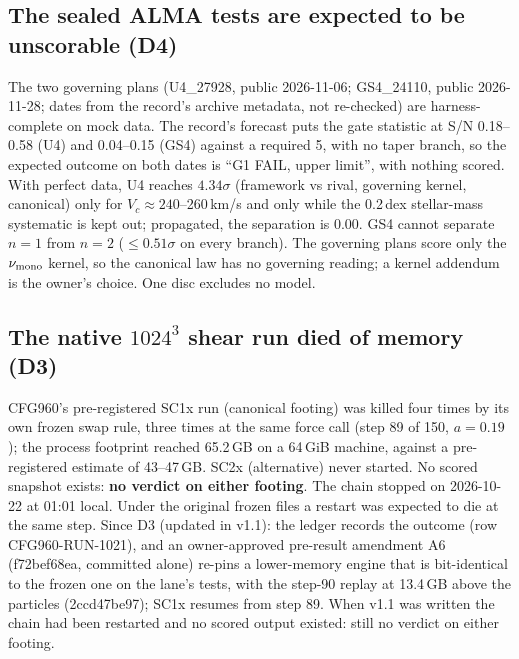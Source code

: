 \documentclass[10pt]{article}
\begin{document}
\subsection{The sealed ALMA tests are expected to be unscorable (D4)}
The two governing plans (U4\_27928, public 2026-11-06; GS4\_24110, public 2026-11-28; dates from the record's archive metadata, not re-checked) are harness-complete on mock data. The record's forecast puts the gate statistic at S/N 0.18--0.58 (U4) and 0.04--0.15 (GS4) against a required 5, with no taper branch, so the expected outcome on both dates is ``G1 FAIL, upper limit'', with nothing scored. With perfect data, U4 reaches $4.34\sigma$ (framework vs rival, governing kernel, canonical) only for $V_c\approx240$--260\,km/s and only while the 0.2\,dex stellar-mass systematic is kept out; propagated, the separation is 0.00. GS4 cannot separate $n=1$ from $n=2$ ($\le0.51\sigma$ on every branch). The governing plans score only the $\nu_{\rm mono}$ kernel, so the canonical law has no governing reading; a kernel addendum is the owner's choice. One disc excludes no model.

\subsection{The native $1024^3$ shear run died of memory (D3)}
CFG960's pre-registered SC1x run (canonical footing) was killed four times by its own frozen swap rule, three times at the same force call (step 89 of 150, $a=0.19$); the process footprint reached 65.2\,GB on a 64\,GiB machine, against a pre-registered estimate of 43--47\,GB. SC2x (alternative) never started. No scored snapshot exists: \textbf{no verdict on either footing}. The chain stopped on 2026-10-22 at 01:01 local. Under the original frozen files a restart was expected to die at the same step. Since D3 (updated in v1.1): the ledger records the outcome (row CFG960-RUN-1021), and an owner-approved pre-result amendment A6 (f72bef68ea, committed alone) re-pins a lower-memory engine that is bit-identical to the frozen one on the lane's tests, with the step-90 replay at 13.4\,GB above the particles (2ccd47be97); SC1x resumes from step 89. When v1.1 was written the chain had been restarted and no scored output existed: still no verdict on either footing.
\end{document}
